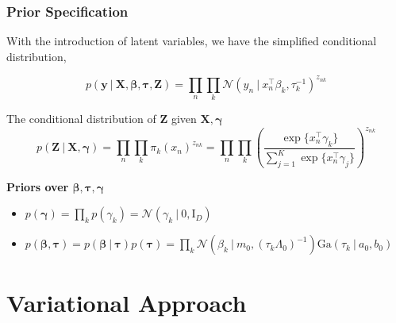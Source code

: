 \documentclass{beamer}
\newcommand{\eye}{\mathrm{I}}
\newcommand\given[1][]{\:#1\vert\:}
\newcommand{\transpose}[1]{#1^{\intercal}}
\newcommand{\nprod}{\prod_{n}}
\newcommand{\kprod}{\prod_{k}}
\newcommand{\boldbeta}{\boldsymbol\beta}
\newcommand{\boldgamma}{\boldsymbol\gamma}
\newcommand{\boldtau}{\boldsymbol\tau}
\newcommand{\sumexp}{\sum_{j=1}^{K} \exp \{ \transpose{x_n} \gamma_j \}}
\begin{document}
\begin{frame}

\frametitle{Prior Specification}
With the introduction of latent variables, we have the simplified conditional distribution,

\begin{equation} \label{eq:conditional}
	p \left( \mathbf{y} \given \mathbf{X}, \boldsymbol\beta, \boldsymbol{\tau}, \mathbf{Z} \right) = 
	\prod_{n} \prod_{k} \mathcal{N} \left( y_n \given \transpose{x_n} \beta_k, \tau_{k}^{-1} \right)^{z_{nk}}
\end{equation}


The conditional distribution of $\mathbf{Z}$ given $\mathbf{X}, \boldgamma$
\begin{equation} \label{eq:cond_Z}
	p \left( \mathbf{Z} \given \mathbf{X}, \boldsymbol\gamma \right) = \nprod \kprod \pi_{k} (x_n)^{z_{nk}} = 
	\nprod \kprod \left( \frac{\exp\{\transpose{x_n} \gamma_k\}}{\sumexp}\right)^{z_{nk}}
\end{equation}
 
\textbf{Priors over $\boldbeta, \boldtau, \boldgamma$}
\begin{itemize}
	\item $p(\boldgamma) = \kprod p(\gamma_k) = \mathcal{N} \left( \gamma_k \given 0, \eye_D \right)$
	\item $p\left( \boldbeta, \boldtau \right) = p\left( \boldbeta \given \boldtau \right) p(\boldtau)= \kprod \mathcal{N} \left( \beta_k \given m_0, (\tau_k \Lambda_0)^{-1} \right) \mathrm{Ga} \left( \tau_k \given a_0, b_0 \right)$
\end{itemize}

\end{frame}


\section{Variational Approach}
\end{document}
